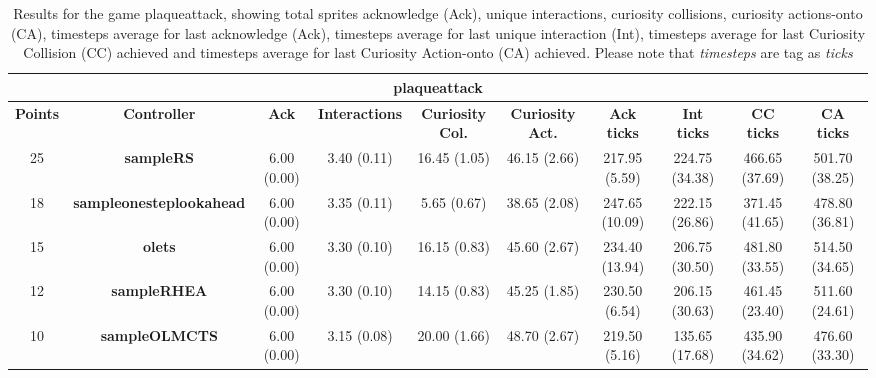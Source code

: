 \begin{table*}[!t]
\begin{center}
\begin{adjustbox}{width=1\textwidth}
\begin{tabular}{|c|c|c|c|c|c|c|c|c|c|}
\multicolumn{10}{c}{\textbf{plaqueattack}}\\
\hline
\textbf{Points} & \textbf{Controller} & \textbf{Ack} & \textbf{Interactions} & \textbf{Curiosity Col.} & \textbf{Curiosity Act.} & \textbf{Ack ticks} & \textbf{Int ticks} & \textbf{CC ticks} & \textbf{CA ticks}\\
\hline
25 & \textbf{sampleRS} & 6.00 (0.00) & 3.40 (0.11) & 16.45 (1.05) & 46.15 (2.66) & 217.95 (5.59) & 224.75 (34.38) & 466.65 (37.69) & 501.70 (38.25)
 \\
\hline
18 & \textbf{sampleonesteplookahead} & 6.00 (0.00) & 3.35 (0.11) & 5.65 (0.67) & 38.65 (2.08) & 247.65 (10.09) & 222.15 (26.86) & 371.45 (41.65) & 478.80 (36.81)
 \\
\hline
15 & \textbf{olets} & 6.00 (0.00) & 3.30 (0.10) & 16.15 (0.83) & 45.60 (2.67) & 234.40 (13.94) & 206.75 (30.50) & 481.80 (33.55) & 514.50 (34.65)
 \\
\hline
12 & \textbf{sampleRHEA} & 6.00 (0.00) & 3.30 (0.10) & 14.15 (0.83) & 45.25 (1.85) & 230.50 (6.54) & 206.15 (30.63) & 461.45 (23.40) & 511.60 (24.61)
 \\
\hline
10 & \textbf{sampleOLMCTS} & 6.00 (0.00) & 3.15 (0.08) & 20.00 (1.66) & 48.70 (2.67) & 219.50 (5.16) & 135.65 (17.68) & 435.90 (34.62) & 476.60 (33.30)
 \\
\hline
\end{tabular}
\end{adjustbox}
\caption{Results for the game plaqueattack, showing total sprites acknowledge (Ack), unique interactions, curiosity collisions, curiosity actions-onto (CA), timesteps average for last acknowledge (Ack),  timesteps average for last unique interaction (Int), timesteps average for last Curiosity Collision (CC) achieved and timesteps average for last Curiosity Action-onto (CA) achieved. Please note that \textit{timesteps} are tag as \textit{ticks}}
\label{tab:weights}
\end{center}
\end{table*}
